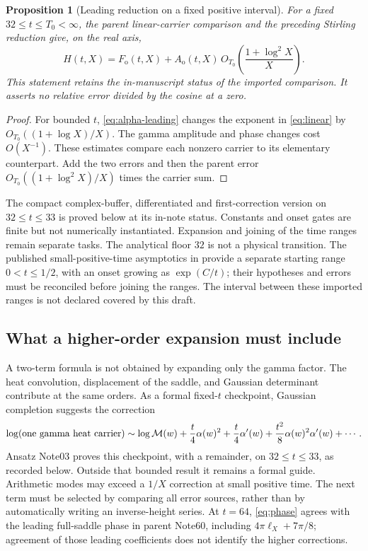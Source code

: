 \documentclass[11pt]{article}
\newcommand{\Mc}{\mathcal M}
\newtheorem{proposition}{Proposition}[section]
\numberwithin{equation}{section}
\begin{document}
\begin{proposition}[Leading reduction on a fixed positive interval]
For a fixed \(32\le t\le T_0<\infty\), the parent linear-carrier
comparison and the preceding Stirling reduction give, on the real axis,
\begin{equation}
H(t,X)=F_{\mathrm o}(t,X)
 +A_{\mathrm o}(t,X)\,
        O_{T_0}\!\left(\frac{1+\log^2X}{X}\right).
\label{eq:outer-fixed}
\end{equation}
This statement retains the in-manuscript status of the imported
comparison. It asserts no relative error divided by the cosine at a zero.
\end{proposition}
\begin{proof}
For bounded \(t\), \eqref{eq:alpha-leading} changes the exponent in
\eqref{eq:linear} by \(O_{T_0}((1+\log X)/X)\).
The gamma amplitude and phase changes cost \(O(X^{-1})\).
These estimates compare each nonzero carrier to its elementary
counterpart. Add the two errors and then the parent error
\(O_{T_0}((1+\log^2X)/X)\) times the carrier sum.
\end{proof}

The compact complex-buffer, differentiated and first-correction version
on \(32\le t\le33\) is proved below at its in-note status. Constants
and onset gates are finite but not numerically instantiated. Expansion
and joining of the time ranges remain separate tasks.
The analytical floor \(32\) is not a physical transition. The published
small-positive-time asymptotics in \cite[Prop.~9.1]{polymath} provide a
separate starting range \(0<t\le1/2\), with an onset growing as
\(\exp(C/t)\); their hypotheses and errors must be reconciled before
joining the ranges. The interval between these imported ranges is not
declared covered by this draft.

\subsection{What a higher-order expansion must include}
A two-term formula is not obtained by expanding only the gamma factor.
The heat convolution, displacement of the saddle, and Gaussian
determinant contribute at the same orders. As a formal fixed-\(t\)
checkpoint, Gaussian completion suggests the correction
\begin{equation}
\log(\hbox{one gamma heat carrier})
\sim \log\Mc(w)+\frac t4\alpha(w)^2
       +\frac t4\alpha'(w)+\frac{t^2}{8}\alpha(w)^2\alpha'(w)+\cdots .
\label{eq:formal-correction}
\end{equation}
Ansatz Note03 proves this checkpoint, with a remainder, on
\(32\le t\le33\), as recorded below. Outside that bounded result it
remains a formal guide. Arithmetic modes may exceed a \(1/X\)
correction at small positive time. The next term must be selected by comparing all error
sources, rather than by automatically writing an inverse-height series.
At \(t=64\), \eqref{eq:phase} agrees with the leading full-saddle phase
in parent Note60, including \(4\pi\ell_X+7\pi/8\); agreement of those
leading coefficients does not identify the higher corrections.
\end{document}
